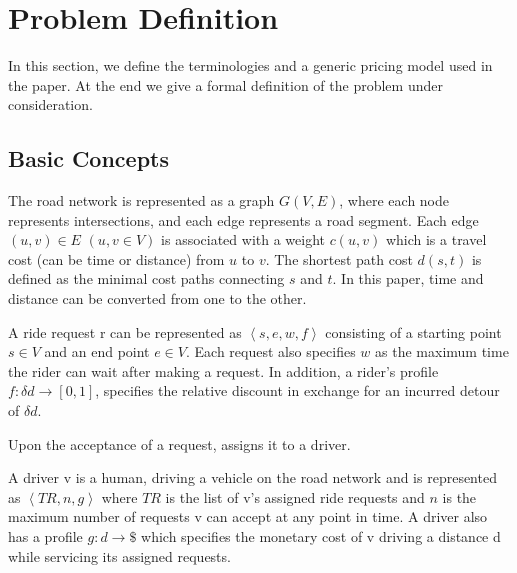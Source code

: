\section{Problem Definition}

In this section, we define the terminologies and a generic pricing model used in the paper.  At the end we give a formal definition of the problem under consideration.

\subsection{Basic Concepts}
The road network is represented as a graph $G(V, E)$, where each node represents intersections, and each edge represents a road segment. 
Each edge $(u,v) \in E$ $(u, v \in V)$ is associated with a weight $c(u,v)$ which is a travel cost (can be time or distance) from $u$ to $v$.
The shortest path cost $d(s,t)$ is defined as the minimal cost paths connecting $s$ and $t$. In this paper, time and distance can be converted from one to the other.

\begin{definition} 
\label{def:req}
A ride request r can be represented as $\left\langle s, e, w, f \right\rangle$ consisting of a starting point $s \in V$ and an end point $e \in V$. Each request also specifies $w$ as the maximum time the rider can wait after making a request. In addition, a rider's profile $f: \delta d \rightarrow \left[ 0, 1 \right] $, specifies the relative discount in exchange for an incurred detour of $\delta d$.
\end{definition}

Upon the acceptance of a request, \fname assigns it to a driver.

\begin{definition} [Driver]
A driver v is a human, driving a vehicle on the road network and is represented as $\left\langle TR, n, g \right\rangle$ where $TR$ is the list of v's assigned ride requests and $n$ is the maximum number of requests v can accept at any point in time. A driver also has a profile $g: d \rightarrow \$ $ which specifies the monetary cost of v driving a distance d while servicing its assigned requests.
\end{definition} 

